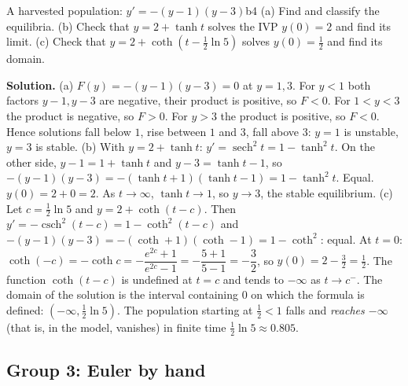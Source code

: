\documentclass[11pt]{article}
\begin{document}
\begin{exmp}{A harvested population: $y'=-(y-1)(y-3)$}{b4}
(a) Find and classify the equilibria. (b) Check that $y=2+\tanh t$ solves the IVP $y(0)=2$ and find its limit. (c) Check that $y=2+\coth\!\left(t-\tfrac12\ln5\right)$ solves $y(0)=\frac12$ and find its domain.

\textbf{Solution.} (a) $F(y)=-(y-1)(y-3)=0$ at $y=1,3$. For $y<1$ both factors $y-1,y-3$ are negative, their product is positive, so $F<0$. For $1<y<3$ the product is negative, so $F>0$. For $y>3$ the product is positive, so $F<0$. Hence solutions fall below $1$, rise between $1$ and $3$, fall above $3$: $y=1$ is unstable, $y=3$ is stable.
(b) With $y=2+\tanh t$: $y'=\operatorname{sech}^2t=1-\tanh^2t$. On the other side, $y-1=1+\tanh t$ and $y-3=\tanh t-1$, so $-(y-1)(y-3)=-(\tanh t+1)(\tanh t-1)=1-\tanh^2t$. Equal. $y(0)=2+0=2$. As $t\to\infty$, $\tanh t\to1$, so $y\to3$, the stable equilibrium.
(c) Let $c=\frac12\ln5$ and $y=2+\coth(t-c)$. Then $y'=-\operatorname{csch}^2(t-c)=1-\coth^2(t-c)$ and $-(y-1)(y-3)=-(\coth+1)(\coth-1)=1-\coth^2$: equal. At $t=0$: $\coth(-c)=-\coth c=-\dfrac{e^{2c}+1}{e^{2c}-1}=-\dfrac{5+1}{5-1}=-\dfrac32$, so $y(0)=2-\frac32=\frac12$. The function $\coth(t-c)$ is undefined at $t=c$ and tends to $-\infty$ as $t\to c^-$. The domain of the solution is the interval containing $0$ on which the formula is defined: $(-\infty,\frac12\ln5)$. The population starting at $\frac12<1$ falls and \emph{reaches $-\infty$} (that is, in the model, vanishes) in finite time $\frac12\ln5\approx0.805$.
\end{exmp}

\subsection*{Group 3: Euler by hand}
\end{document}
